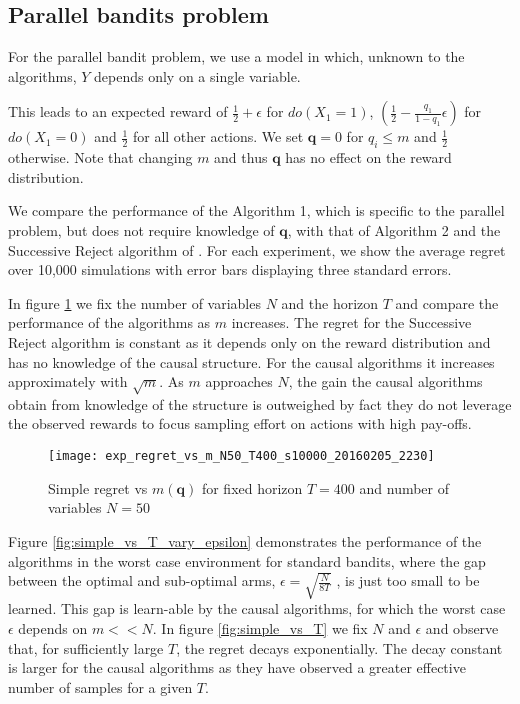 \subsection{Parallel bandits problem}

For the parallel bandit problem, we use a model in which, unknown to the algorithms, $Y$ depends only on a single variable.

This leads to an expected reward of $\frac{1}{2}+\epsilon$ for $do(X_1=1)$, $\left(\frac{1}{2}-\frac{q_1}{1-q_1}\epsilon\right)$ for $do(X_1=0)$ and $\frac{1}{2}$ for all other actions. We set $\boldsymbol{q} = 0$ for $q_i \leq m$ and $\frac{1}{2}$ otherwise. Note that changing $m$ and thus $\boldsymbol{q}$ has no effect on the reward distribution. 

We compare the performance of the Algorithm 1, which is specific to the parallel problem, but does not require knowledge of $\boldsymbol{q}$, with that of Algorithm 2 and the Successive Reject algorithm of \cite{audibert2010best}. For each experiment, we show the average regret over 10,000 simulations with error bars displaying three standard errors.

In figure \ref{fig:simple_vs_m} we fix the number of variables $N$ and the horizon $T$ and compare the performance of the algorithms as $m$ increases. The regret for the Successive Reject algorithm is constant as it depends only on the reward distribution and has no knowledge of the causal structure. For the causal algorithms it increases approximately with $\sqrt{m}$. As $m$ approaches $N$, the gain the causal algorithms obtain from knowledge of the structure is outweighed by fact they do not leverage the observed rewards to focus sampling effort on actions with high pay-offs.

\begin{figure}[h]
\centering
\texttt{[image: exp\_regret\_vs\_m\_N50\_T400\_s10000\_20160205\_2230]}
\caption{Simple regret vs $m(\boldsymbol{q})$ for fixed horizon $T=400$ and number of variables $N = 50$}
\label{fig:simple_vs_m}
\end{figure}

Figure \ref{fig:simple_vs_T_vary_epsilon} demonstrates the performance of the algorithms in the worst case environment for standard bandits, where the gap between the optimal and sub-optimal arms, $\epsilon = \sqrt{\frac{N}{8T}}$ , is just too small to be learned. This gap is learn-able by the causal algorithms, for which the worst case $\epsilon$ depends on $m << N$. In figure \ref{fig:simple_vs_T} we fix $N$ and $\epsilon$ and observe that, for sufficiently large $T$, the regret decays exponentially. The decay constant is larger for the causal algorithms as they have observed a greater effective number of samples for a given $T$. 

